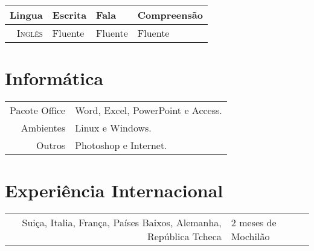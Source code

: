 \documentclass[a4paper,10pt]{article} %
\begin{document}
\begin{tabular}{r|lll}
Lingua & Escrita & Fala & Compreensão \\
\hline
\textsc{Inglês} & Fluente & Fluente & Fluente \\
\end{tabular}

 
\section{Informática}

\begin{tabular}{r|l}
Pacote Office & Word, Excel, PowerPoint e Access.\\
Ambientes & Linux e Windows.\\
Outros & Photoshop e Internet.\\
\end{tabular}

 
\section{Experiência Internacional}

\begin{tabular}{r|l}
Suiça, Italia, França, Países Baixos, Alemanha, República Tcheca & 2 meses de Mochilão\\
\end{tabular}
\end{document}
